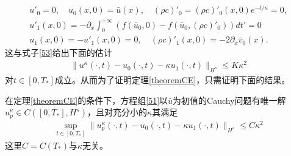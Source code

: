 \begin{eqnarray*}
 u'_0 =0, \quad u_0(x,0) = \bar{u}(x), \quad  (\rho c)'_0 = (\rho c)'_0(x,0)e^{-t/\kappa}=0 , \\[4mm]
 u'_1(x,0) = -\partial_x\int_0^{+\infty} (f(\bar u_0,0) - f(\bar u_0,(\rho c)'_0)) dt'=0\\
 u_1(x,0) =  - u'_1(x,0)=0, \quad (\rho c)'_1(x,0) = - 2\partial_x\bar v_0(x).
\end{eqnarray*}
这与式子\eqref{53}给出下面的估计
\begin{eqnarray*}
  \|u^\kappa(\cdot, t) - u_0 (\cdot, t) - \kappa u_1(\cdot, t) \|_{H^s} \le K \kappa^2
\end{eqnarray*}
对$t \in [0,T_*]$成立。从而为了证明定理\ref{theoremCE}，只需证明下面的结果。



\begin{lemma}\label{lemmaCE}
在定理\ref{theoremCE}的条件下，方程组\eqref{51}以$\bar{u}$为初值的Cauchy问题有唯一解$u_p^\kappa \in C([0,T_*],H^s)$，且对充分小的$\kappa$其满足
\begin{eqnarray}\label{eq:wcediff}
  \sup_{t \in [0,T_*]} \| u^\kappa_p(\cdot,t) - u_0 (\cdot, t) - \kappa u_1(\cdot, t)\|_{H^s} \le C \kappa^2
\end{eqnarray}
这里$C=C(T_*)$与$\kappa$无关。
\end{lemma}


